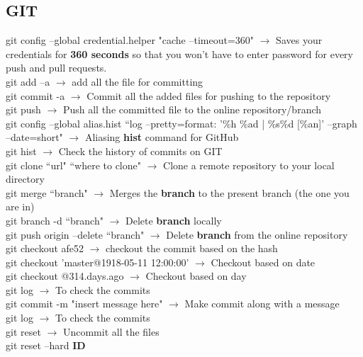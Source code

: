 \documentclass[twoside,a4paper]{article}
\newcommand{\tcb}{\color{blue}}
\newcommand{\tcc}{\color{cyan}}
\newcommand{\tcr}{\color{red}}
\newcommand{\tck}{\color{black}}
\newcommand{\ra }{$\rightarrow$ }
\newcommand{\hs}{\hspace}
\begin{document}
\begin{multicols}{2}
    \tcc \section{GIT}

    \hs{-0.8 cm} \tcr  git config --global credential.helper
    "cache --timeout=360" \tck \ra Saves your credentials
    for \textbf{360 seconds} so that you won't have to enter password for
    every push and pull requests.\\
    \tcr git add --a \tck \ra add all the
    file for committing\\
    \tcr git commit -a \tck \ra Commit all the added
    files for pushing to the repository \\
    \tcr git push \tck \ra Push all the committed
    file to the online repository/branch \\
    \tcr git \tcb config --global alias.hist
    ``log --pretty=format: '\%h \%ad | \%s\%d [\%an]' --graph --date=short"
    \tck \ra Aliasing \textbf{hist} command for GitHub\\
    \tcr git hist \tck \ra Check the history of
    commits on GIT\\
    \tcr git clone \tcb ``url" ``where to clone"
    \tck  \ra Clone a remote repository to your local
    directory\\
    \tcr git merge \tcb ``branch" \tck $\rightarrow$
    Merges the \textbf{branch} to the present branch (the one you are in)\\
    \tcr git branch \tcb -d ``branch" \tck
    \ra Delete \textbf{branch} locally\\
    \tcr git push \tcb origin --delete ``branch" \tck
    \ra Delete \textbf{branch} from the online repository\\
    \tcr git checkout \tcb afe52 \tck \ra
    checkout the commit based on the hash\\
    \tcr git checkout \tcb 'master@{1918-05-11 12:00:00}'
    \tck \ra Checkout based on date\\
    \tcr git checkout \tcb @{314.days.ago}
    \tck \ra Checkout based on day\\
    \tcr git log \tck \ra To check the commits\\
    \tcr git commit \tcb -m "insert message here"\tck
    \ra Make commit along with a message\\
    \tcr git log \tck \ra To check the commits\\
    \tcr git reset \tck \ra Uncommit all the files\\
    \tcr git reset \tcb --hard \textbf{ID} \tck

\end{multicols}
\end{document}
